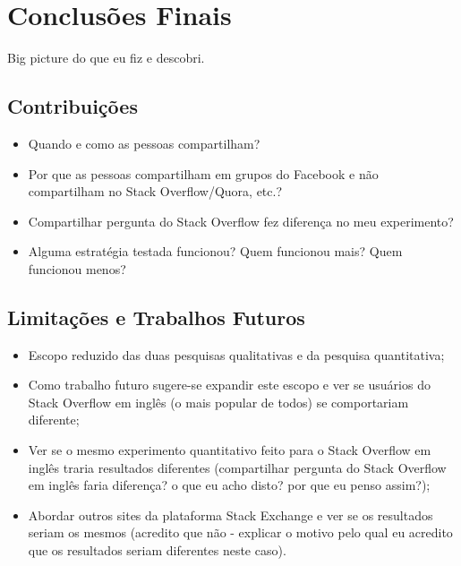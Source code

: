 \chapter{Conclusões Finais}
Big picture do que eu fiz e descobri.

\section{Contribuições}
\begin{itemize}
\item Quando e como as pessoas compartilham?
\item Por que as pessoas compartilham em grupos do Facebook e não compartilham no Stack Overflow/Quora, etc.? 
\item Compartilhar pergunta do Stack Overflow fez diferença no meu experimento?
\item Alguma estratégia testada funcionou? Quem funcionou mais? Quem funcionou menos?
\end{itemize}

\section{Limitações e Trabalhos Futuros}
\begin{itemize}
\item Escopo reduzido das duas pesquisas qualitativas e da pesquisa quantitativa;
\item Como trabalho futuro sugere-se expandir este escopo e ver se usuários do Stack Overflow em inglês (o mais popular de todos) se comportariam diferente;
\item Ver se o mesmo experimento quantitativo feito para o Stack Overflow em inglês traria resultados diferentes (compartilhar pergunta do Stack Overflow em inglês faria diferença? o que eu acho disto? por que eu penso assim?);
\item Abordar outros sites da plataforma Stack Exchange e ver se os resultados seriam os mesmos (acredito que não - explicar o motivo pelo qual eu acredito que os resultados seriam diferentes neste caso).
\end{itemize}